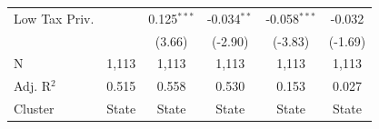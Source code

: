 \begin{tabular*}{\textwidth}{@{\extracolsep{\fill}}lccccc}
   Low Tax Priv.        &                & 0.125$^{***}$  & -0.034$^{**}$  & -0.058$^{***}$ & -0.032\\   
                        &                & (3.66)        & (-2.90)       & (-3.83)       & (-1.69)\\   
   \hline
   N         & 1,113          & 1,113          & 1,113          & 1,113          & 1,113\\  
   Adj. R$^2$       & 0.515          & 0.558          & 0.530          & 0.153          & 0.027\\  
   Cluster              & State & State & State & State & State\\  
   \bottomrule
\end{tabular*}
\par\endgroup
